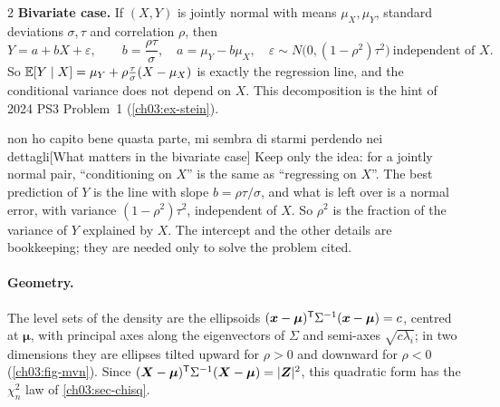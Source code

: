 \begin{paracol}{2}
\noindent\textbf{Bivariate case.} If $(X,Y)$ is jointly normal with means $\mu_X,\mu_Y$, standard deviations
$\sigma,\tau$ and correlation $\rho$, then
\begin{equation}\label{ch03:eq-bivreg}
  Y=a+bX+\varepsilon,\qquad b=\frac{\rho\tau}{\sigma},\quad a=\mu_Y-b\mu_X,\quad \varepsilon\sim N\bigl(0,(1-\rho^2)\tau^2\bigr)\ \text{independent of }X .
\end{equation}
So $\mathbb{E}[Y\mid X]=\mu_Y+\rho\frac{\tau}{\sigma}(X-\mu_X)$ is exactly the regression line, and the conditional variance does
not depend on $X$. This decomposition is the hint of 2024 PS3 Problem~1 (\cref{ch03:ex-stein}).\begin{answer}{non ho capito bene quasta parte, mi sembra di starmi perdendo nei dettagli}[What matters in the bivariate case]
Keep only the idea: for a jointly normal pair, ``conditioning on $X$'' is the same as ``regressing on $X$''. The best prediction of $Y$ is the
line with slope $b=\rho\tau/\sigma$, and what is left over is a normal error, with variance $(1-\rho^2)\tau^2$, independent of $X$. So
$\rho^2$ is the fraction of the variance of $Y$ explained by $X$. The intercept and the other details are bookkeeping; they are
needed only to solve the problem cited.
\end{answer}

\paragraph{Geometry.} The level sets of the density are the ellipsoids $(\bm x-\bm\mu)^{\mathsf T}\Sigma^{-1}(\bm x-\bm\mu)=c$, centred at
$\bm\mu$, with principal axes along the eigenvectors of $\Sigma$ and semi-axes $\sqrt{c\lambda_i}$; in two dimensions they
are ellipses tilted upward for $\rho>0$ and downward for $\rho<0$  (\cref{ch03:fig-mvn}). Since
$(\bm X-\bm\mu)^{\mathsf T}\Sigma^{-1}(\bm X-\bm\mu)=|\bm Z|^2$, this quadratic form has the $\chi^2_n$ law of \cref{ch03:sec-chisq}.


\end{paracol}
